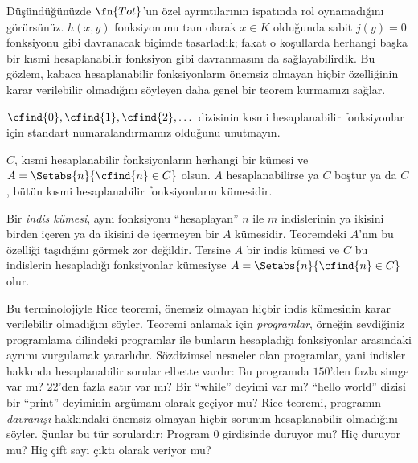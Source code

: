 \documentclass[../../../include/open-logic-section]{subfiles}
\begin{document}

Düşündüğünüzde $\fn{Tot}$'un özel ayrıntılarının
 ispatında rol oynamadığını görürsünüz. $h(x,y)$
fonksiyonunu tam olarak $x\in K$ olduğunda sabit $j(y)=0$ fonksiyonu gibi
davranacak biçimde tasarladık; fakat o koşullarda herhangi başka bir kısmi
hesaplanabilir fonksiyon gibi davranmasını da sağlayabilirdik. Bu gözlem,
kabaca hesaplanabilir fonksiyonların önemsiz olmayan hiçbir özelliğinin karar
verilebilir olmadığını söyleyen daha genel bir teorem kurmamızı sağlar.

$\cfind{0},\cfind{1},\cfind{2},\dots$ dizisinin kısmi hesaplanabilir
fonksiyonlar için standart numaralandırmamız olduğunu unutmayın.

\begin{thm}
  $C$, kısmi hesaplanabilir fonksiyonların herhangi bir kümesi ve
  $A=\Setabs{n}{\cfind{n}\in C}$ olsun. $A$ hesaplanabilirse ya $C$ boştur
  ya da $C$, bütün kısmi hesaplanabilir fonksiyonların kümesidir.
\end{thm}

Bir \emph{indis kümesi}, aynı fonksiyonu ``hesaplayan'' $n$ ile $m$
indislerinin ya ikisini birden içeren ya da ikisini de içermeyen bir $A$
kümesidir. Teoremdeki $A$'nın bu özelliği taşıdığını görmek zor değildir.
Tersine $A$ bir indis kümesi ve $C$ bu indislerin hesapladığı fonksiyonlar
kümesiyse $A=\Setabs{n}{\cfind{n}\in C}$ olur.

\begin{explain}
Bu terminolojiyle Rice teoremi, önemsiz olmayan hiçbir indis kümesinin karar
verilebilir olmadığını söyler. Teoremi anlamak için \emph{programlar}, örneğin
sevdiğiniz programlama dilindeki programlar ile bunların hesapladığı
fonksiyonlar arasındaki ayrımı vurgulamak yararlıdır. Sözdizimsel nesneler
olan programlar, yani indisler hakkında hesaplanabilir sorular elbette
vardır: Bu programda $150$'den fazla simge var mı? $22$'den fazla satır var
mı? Bir ``while'' deyimi var mı? ``hello world'' dizisi bir ``print''
deyiminin argümanı olarak geçiyor mu? Rice teoremi, programın
\emph{davranışı} hakkındaki önemsiz olmayan hiçbir sorunun hesaplanabilir
olmadığını söyler. Şunlar bu tür sorulardır: Program $0$ girdisinde duruyor
mu? Hiç duruyor mu? Hiç çift sayı çıktı olarak veriyor mu?
\end{explain}
\end{document}
